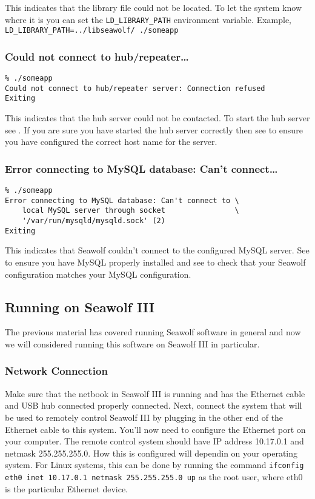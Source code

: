 This indicates that the \libseawolf{} library file could not be located. To let
the system know where it is you can set the \texttt{LD\_LIBRARY\_PATH}
environment variable. Example, \texttt{LD\_LIBRARY\_PATH=../libseawolf/ ./someapp}

\subsubsection{Could not connect to hub/repeater\ldots{}}
\begin{lstlisting}
% ./someapp
Could not connect to hub/repeater server: Connection refused
Exiting
\end{lstlisting}

This indicates that the hub server could not be contacted. To start the hub
server see . If you are sure
you have started the hub server correctly then see
 to ensure you have configured
the correct host name for the server.

\subsubsection{Error connecting to MySQL database: Can't connect\ldots{}}
\begin{lstlisting}
% ./someapp
Error connecting to MySQL database: Can't connect to \
    local MySQL server through socket                \
    '/var/run/mysqld/mysqld.sock' (2)
Exiting
\end{lstlisting}
This indicates that Seawolf couldn't connect to the configured MySQL server. See
 to ensure you have MySQL
properly installed and see \interlink{runningconfig}{Seawolf Configuration} to
check that your Seawolf configuration matches your MySQL configuration.

\subsection{Running on Seawolf III} \label{runningsw3}
The previous material has covered running Seawolf software in general and now we
will considered running this software on Seawolf III in particular.

\subsubsection{Network Connection} \label{runningsw3net}
Make sure that the netbook in Seawolf III is running and has the Ethernet cable
and USB hub connected properly connected. Next, connect the system that will be
used to remotely control Seawolf III by plugging in the other end of the
Ethernet cable to this system. You'll now need to configure the Ethernet port on
your computer. The remote control system should have IP address 10.17.0.1 and
netmask 255.255.255.0. How this is configured will dependin on your operating
system. For Linux systems, this can be done by running the command
\texttt{ifconfig eth0 inet 10.17.0.1 netmask 255.255.255.0 up} as the root user,
where eth0 is the particular Ethernet device.

